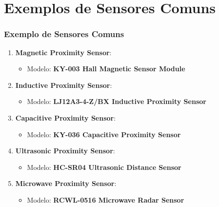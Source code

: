 \documentclass[xcolor=dvipsnames, aspectratio=169]{beamer}
\begin{document}
\section[Exemplos de Sensores Comuns]{Exemplos de Sensores Comuns} 
\begin{frame}[fragile]
	\frametitle{Exemplo de Sensores Comuns}
	\begin{enumerate}
		\item \textbf{Magnetic Proximity Sensor}:
			\begin{itemize}
				\item Modelo: \textbf{KY-003 Hall Magnetic Sensor Module}
			\end{itemize}
		\item \textbf{Inductive Proximity Sensor}:
			\begin{itemize}
				\item Modelo: \textbf{LJ12A3-4-Z/BX Inductive Proximity Sensor}
			\end{itemize}
		\item \textbf{Capacitive Proximity Sensor}:
			\begin{itemize}
				\item Modelo: \textbf{KY-036 Capacitive Proximity Sensor}
			\end{itemize}
		\item \textbf{Ultrasonic Proximity Sensor}:
			\begin{itemize}
				\item Modelo: \textbf{HC-SR04 Ultrasonic Distance Sensor}
			\end{itemize}
		\item \textbf{Microwave Proximity Sensor}:
			\begin{itemize}
				\item Modelo: \textbf{RCWL-0516 Microwave Radar Sensor}
			\end{itemize}
	\end{enumerate}
			
\end{frame}
\end{document}
